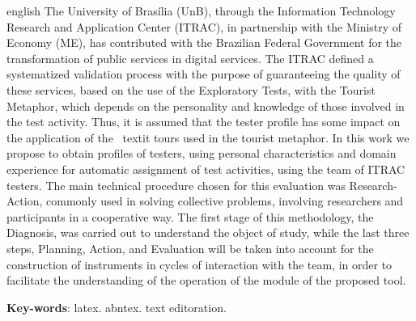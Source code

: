 \begin{resumo}[Abstract]
 \begin{otherlanguage*}{english}
   The University of Brasília (UnB), through the Information Technology Research and Application Center (ITRAC), in partnership with the Ministry of Economy (ME), has contributed with the Brazilian Federal Government for the transformation of public services in digital services. The ITRAC defined a systematized validation process with the purpose of guaranteeing the quality of these services, based on the use of the Exploratory Tests, with the Tourist Metaphor, which depends on the personality and knowledge of those involved in the test activity. Thus, it is assumed that the tester profile has some impact on the application of the \ textit {tours} used in the tourist metaphor. In this work we propose to obtain profiles of testers, using personal characteristics and domain experience for automatic assignment of test activities, using the team of ITRAC testers. The main technical procedure chosen for this evaluation was Research-Action, commonly used in solving collective problems, involving researchers and participants in a cooperative way. The first stage of this methodology, the Diagnosis, was carried out to understand the object of study, while the last three steps, Planning, Action, and Evaluation will be taken into account for the construction of instruments in cycles of interaction with the team, in order to facilitate the understanding of the operation of the module of the proposed tool.

   \vspace{\onelineskip}

   \noindent
   \textbf{Key-words}: latex. abntex. text editoration.
 \end{otherlanguage*}
\end{resumo}
